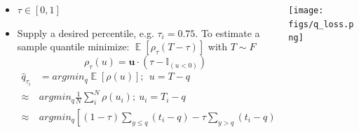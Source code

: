 \documentclass[t, pdftex]{beamer}
\DeclareMathOperator*{\E}{\mathbb{E}}
\begin{document}
\begin{frame}
{\begin{columns}
\begin{column}{0.5\textwidth}
{\begin{itemize}
                    \item $\tau \in [0, 1]$
                    \item Supply a desired percentile, e.g. $\tau_i = 0.75$.
                    To estimate a sample quantile minimize: $\E[\rho_\tau(T - \tau)]$ with $T \sim F$
                    \[
                    \rho_\tau( u) = \mathbf u \cdot (\tau - \mathbb{I}_{( u < 0)})
                    \]
                    \begin{equation}
                    \left.\begin{aligned}
                    \hat q_{\tau_i} &= argmin_{q} \E[\rho(u)];\ \  u = T - q  \\
                    \approx & argmin_q  \frac{1}{N} \sum_i^N \rho(u_i); \ u_i = T_i - q \\
                    \approx & argmin_q \left[ (1-\tau) \sum_{y \leq q}( t_i - q ) - \tau \sum_{y > q} (t_i - q) \right]
                    \end{aligned}\right. \nonumber
                    \end{equation}
                \end{itemize}
            }
        \end{column}
        \begin{column}{0.5\textwidth}  %
            \begin{center}
                \texttt{[image: figs/q\_loss.png]}
            \end{center}
        \end{column}
    \end{columns}
}
\end{frame}

\end{document}
